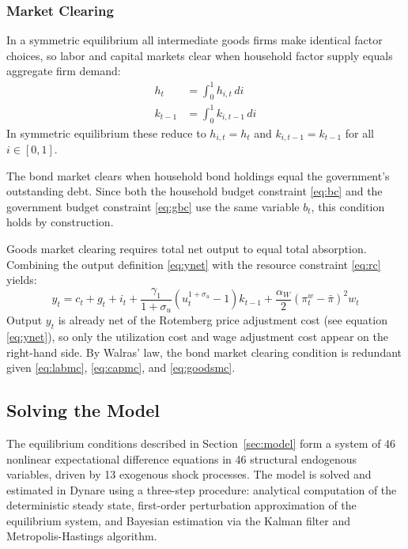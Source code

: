 \documentclass[article,11pt,letterpaper,fleqn]{article}
\theoremstyle{definition}
\numberwithin{equation}{section}
\begin{document}
\subsubsection{Market Clearing}

In a symmetric equilibrium all intermediate goods firms make identical factor choices, so labor and capital markets clear when household factor supply equals aggregate firm demand:
\begin{align}
h_t &= \int_0^1 h_{i,t}\,di \label{eq:labmc} \\
k_{t-1} &= \int_0^1 k_{i,t-1}\,di \label{eq:capmc}
\end{align}
In symmetric equilibrium these reduce to $h_{i,t} = h_t$ and $k_{i,t-1} = k_{t-1}$ for all $i \in [0,1]$.

The bond market clears when household bond holdings equal the government's outstanding debt. Since both the household budget constraint \eqref{eq:bc} and the government budget constraint \eqref{eq:gbc} use the same variable $b_t$, this condition holds by construction.

Goods market clearing requires total net output to equal total absorption. Combining the output definition \eqref{eq:ynet} with the resource constraint \eqref{eq:rc} yields:
\begin{equation}\label{eq:goodsmc}
y_t = c_t + g_t + i_t + \frac{\gamma_1}{1+\sigma_u}\!\left(u_t^{1+\sigma_u}-1\right)k_{t-1} + \frac{\alpha_W}{2}(\pi_t^w - \bar{\pi})^2 w_t
\end{equation}
Output $y_t$ is already net of the Rotemberg price adjustment cost (see equation \eqref{eq:ynet}), so only the utilization cost and wage adjustment cost appear on the right-hand side. By Walras' law, the bond market clearing condition is redundant given \eqref{eq:labmc}, \eqref{eq:capmc}, and \eqref{eq:goodsmc}.

\subsection{Solving the Model}
\label{sec:solution}

The equilibrium conditions described in Section~\ref{sec:model} form a system of 46 nonlinear expectational difference equations in 46 structural endogenous variables, driven by 13 exogenous shock processes. The model is solved and estimated in Dynare using a three-step procedure: analytical computation of the deterministic steady state, first-order perturbation approximation of the equilibrium system, and Bayesian estimation via the Kalman filter and Metropolis-Hastings algorithm.
\end{document}
